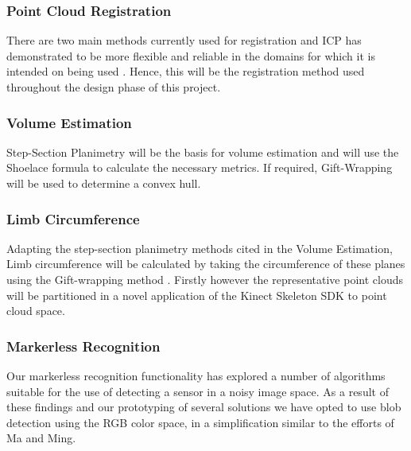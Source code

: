 \subsubsection{Point Cloud Registration}
There are two main methods currently used for registration and ICP has demonstrated to be more flexible and reliable in the domains for which it is intended on being used \cite{chen92}. Hence, this will be the registration method used throughout the design phase of this project. \\

\subsubsection{Volume Estimation}
Step-Section Planimetry \cite{K1991} will be the basis for volume estimation and will use the Shoelace formula \cite{Pretzsch2009} to calculate the necessary metrics. If required, Gift-Wrapping \cite{Cormen2001} will be used to determine a convex hull. \\

\subsubsection{Limb Circumference}

Adapting the step-section planimetry methods cited in the Volume Estimation, Limb circumference will be calculated by taking the circumference of these planes using the Gift-wrapping method \cite{Cormen2001}. Firstly however the representative point clouds will be partitioned in a novel application of the Kinect Skeleton SDK to point cloud space. \\

\subsubsection{Markerless Recognition}

Our markerless recognition functionality has explored a number of algorithms suitable for the use of detecting a sensor in a noisy image space. As a result of these findings and our prototyping of several solutions we have opted to use blob detection using the RGB color space, in a simplification similar to the efforts of Ma and Ming. \cite{blob_detection_MingMa} \\